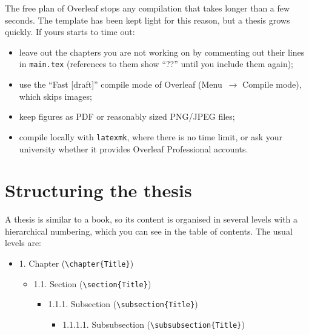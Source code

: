 The free plan of Overleaf stops any compilation that takes longer than a few seconds. The
template has been kept light for this reason, but a thesis grows quickly. If yours starts to
time out:

\begin{itemize}
  \item leave out the chapters you are not working on by commenting out their
        \verb|| lines in \texttt{main.tex} (references to them show \enquote{??}
        until you include them again);
  \item use the \enquote{Fast [draft]} compile mode of Overleaf (Menu~$\rightarrow$
        Compile mode), which skips images;
  \item keep figures as PDF or reasonably sized PNG/JPEG files;
  \item compile locally with \texttt{latexmk}, where there is no time limit, or ask your
        university whether it provides Overleaf Professional accounts.
\end{itemize}

\section{Structuring the thesis}\label{sec:structuring}

A thesis is similar to a book, so its content is organised in several levels with a
hierarchical numbering, which you can see in the table of contents. The usual levels are:

\begin{itemize}
  \item 1. Chapter (\verb|\chapter{Title}|)
  \begin{itemize}
    \item 1.1. Section (\verb|\section{Title}|)
    \begin{itemize}
      \item 1.1.1. Subsection (\verb|\subsection{Title}|)
      \begin{itemize}
        \item 1.1.1.1. Subsubsection (\verb|\subsubsection{Title}|)
      \end{itemize}
    \end{itemize}
  \end{itemize}
\end{itemize}

